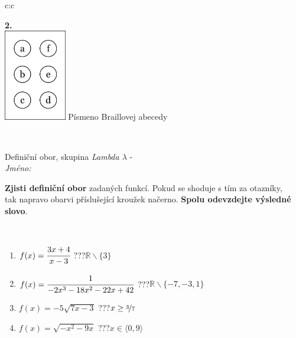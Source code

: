 \documentclass[10pt]{report}
\begin{document}
\begin{tabular}{c:c}
\begin{minipage}[c][104.5mm][t]{0.5\linewidth}
\begin{center}
\begin{minipage}{0.20\linewidth}
\begin{center}
{\Huge\bfseries 2.} \\[2mm]
\includegraphics[height=40mm]{../images/braille.png}
{\small Písmeno Braillovej abecedy}
\end{center}
\end{minipage}
\end{center}
\end{minipage}
\\ \hdashline
\begin{minipage}[c][104.5mm][t]{0.5\linewidth}
\begin{center}
\vspace{7mm}
{\huge Definiční obor, skupina \textit{Lambda $\lambda$} -}\\[5mm]
\textit{Jméno:}\phantom{xxxxxxxxxxxxxxxxxxxxxxxxxxxxxxxxxxxxxxxxxxxxxxxxxxxxxxxxxxxxxxxxx}\\[5mm]
\begin{minipage}{0.95\linewidth}
\begin{center}
\textbf{Zjisti definiční obor} zadaných funkcí. Pokud se shoduje s tím za otazníky,\\tak napravo obarvi příslušející kroužek načerno. \textbf{Spolu odevzdejte výsledné slovo}.
\end{center}
\end{minipage}
\\[1mm]
\begin{minipage}{0.79\linewidth}
\begin{center}
\begin{varwidth}{\linewidth}
\begin{enumerate}
\normalsizerrr
\item $f(x)=\cfrac{3x+4}{x-3}$\quad \dotfill\; ???\;\dotfill \quad $\mathbb{R}\smallsetminus\{3\}$
\item $f(x)=\cfrac{1}{-2x^3-18x^2-22x+42}$\quad \dotfill\; ???\;\dotfill \quad $\mathbb{R}\smallsetminus\{-7,-3,1\}$
\item $f(x)=-5\sqrt{7x-3}$\quad \dotfill\; ???\;\dotfill \quad $x\geq\nicefrac{3}{7}$
\item $f(x)=\sqrt{-x^2-9x}$\quad \dotfill\; ???\;\dotfill \quad $x\in\langle0 , 9\rangle$

\end{enumerate}
\end{varwidth}
\end{center}
\end{minipage}
\end{center}
\end{minipage}
\end{tabular}
\end{document}
